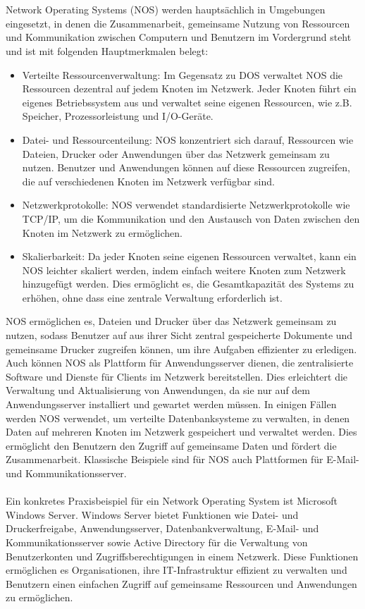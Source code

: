 \\\\
Network Operating Systems (NOS) werden hauptsächlich in Umgebungen eingesetzt, in denen die Zusammenarbeit, gemeinsame Nutzung von Ressourcen und Kommunikation zwischen Computern und Benutzern im Vordergrund steht und ist mit folgenden Hauptmerkmalen belegt: 
\begin{itemize}
\item Verteilte Ressourcenverwaltung: Im Gegensatz zu DOS verwaltet NOS die Ressourcen dezentral auf jedem Knoten im Netzwerk. Jeder Knoten führt ein eigenes Betriebssystem aus und verwaltet seine eigenen Ressourcen, wie z.B. Speicher, Prozessorleistung und I/O-Geräte.
\item Datei- und Ressourcenteilung: NOS konzentriert sich darauf, Ressourcen wie Dateien, Drucker oder Anwendungen über das Netzwerk gemeinsam zu nutzen. Benutzer und Anwendungen können auf diese Ressourcen zugreifen, die auf verschiedenen Knoten im Netzwerk verfügbar sind.
\item Netzwerkprotokolle: NOS verwendet standardisierte Netzwerkprotokolle wie TCP/IP, um die Kommunikation und den Austausch von Daten zwischen den Knoten im Netzwerk zu ermöglichen.
\item Skalierbarkeit: Da jeder Knoten seine eigenen Ressourcen verwaltet, kann ein NOS leichter skaliert werden, indem einfach weitere Knoten zum Netzwerk hinzugefügt werden. Dies ermöglicht es, die Gesamtkapazität des Systems zu erhöhen, ohne dass eine zentrale Verwaltung erforderlich ist.
\end{itemize}
NOS ermöglichen es, Dateien und Drucker über das Netzwerk gemeinsam zu nutzen, sodass Benutzer auf aus ihrer Sicht zentral gespeicherte Dokumente und gemeinsame Drucker zugreifen können, um ihre Aufgaben effizienter zu erledigen. Auch können NOS als Plattform für Anwendungsserver dienen, die zentralisierte Software und Dienste für Clients im Netzwerk bereitstellen. Dies erleichtert die Verwaltung und Aktualisierung von Anwendungen, da sie nur auf dem Anwendungsserver installiert und gewartet werden müssen. In einigen Fällen werden NOS verwendet, um verteilte Datenbanksysteme zu verwalten, in denen Daten auf mehreren Knoten im Netzwerk gespeichert und verwaltet werden. Dies ermöglicht den Benutzern den Zugriff auf gemeinsame Daten und fördert die Zusammenarbeit. Klassische Beispiele sind für NOS auch Plattformen für E-Mail- und Kommunikationsserver.
\\\\
Ein konkretes Praxisbeispiel für ein Network Operating System ist Microsoft Windows Server. Windows Server bietet Funktionen wie Datei- und Druckerfreigabe, Anwendungsserver, Datenbankverwaltung, E-Mail- und Kommunikationsserver sowie Active Directory für die Verwaltung von Benutzerkonten und Zugriffsberechtigungen in einem Netzwerk. Diese Funktionen ermöglichen es Organisationen, ihre IT-Infrastruktur effizient zu verwalten und Benutzern einen einfachen Zugriff auf gemeinsame Ressourcen und Anwendungen zu ermöglichen.

